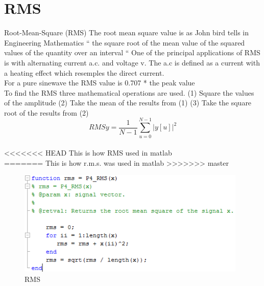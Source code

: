 \section{RMS}
Root-Mean-Square (RMS)
The root mean square value is as John bird tells in Engineering Mathematics \citep{Bird2007
} “ the square root of the mean value of the squared values of the quantity over an interval “
One of the principal applications of RMS is with alternating current a.c. and voltage v. The a.c is defined as a current with a heating effect which resemples the direct current. \citep{Bird2007}
\\
For a pure sinewave the RMS value is 0.707 * the peak value
\\
To find the RMS three mathematical operations are used.
(1)	Square the values of the amplitude
(2)	Take the mean of the results from (1)
(3)	Take the square root of the results from (2)
\begin{equation}\label{eq:RMS formular}
RMSy = \frac{1}{N-1}\sum_{u=0}^{N-1}|y[u]|^2
\end{equation}
\\
<<<<<<< HEAD
This is how RMS used in matlab\\
=======
This is how r.m.s. was used in matlab
>>>>>>> master
\begin{figure}
\begin{center}
\includegraphics[height=5cm]{fig/RMS_matlabCode.png}
\caption{RMS}
\end{center}
\end{figure}
